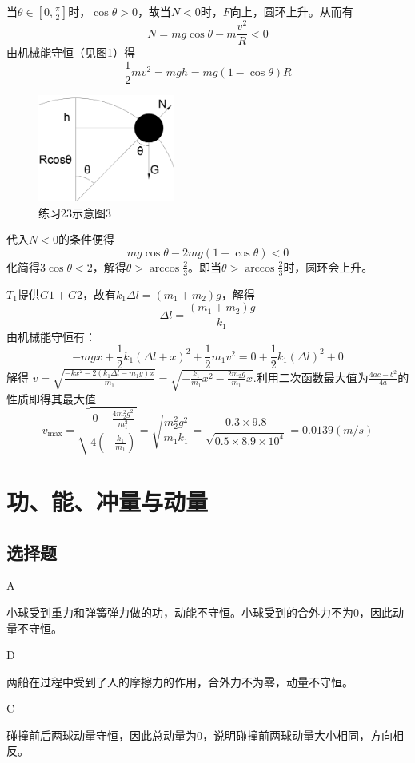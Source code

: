 \documentclass[b5paper,opensource,sourcefont,parskip]{qyxf-book}
\begin{document}
当$\theta\in[0,\frac{\pi}{2}]$时，$\cos\theta>0$，故当$N<0$时，$F$向上，圆环上升。从而有
\[N=mg\cos\theta-m\frac{v^2}{R}<0\]
由机械能守恒（见图\ref{fig:t23-3}）得
\[\frac{1}{2}mv^2=mgh=mg(1-\cos\theta)R\]

\begin{figure}[htbp]
	\centering
	\includegraphics[height=100pt]{Chp2_illus4.png}
	\caption{练习23示意图3}\label{fig:t23-3}
\end{figure}

代入$N<0$的条件便得
\[mg\cos\theta-2mg(1-\cos\theta)<0\]
化简得$3\cos\theta<2$，解得$\theta>\arccos\frac{2}{3}$。即当$\theta>\arccos\frac{2}{3}$时，圆环会上升。


\solve $T_1$提供$G1+G2$，故有$k_1\Delta l=(m_1+m_2)g$，解得
\[\Delta l=\frac{(m_1+m_2)g}{k_1}\]
由机械能守恒有：
\[-mgx+\frac{1}{2}k_1(\Delta l+x)^2+\frac{1}{2}m_1v^2=0+\frac{1}{2}k_1(\Delta l)^2+0\]
解得
$v=\sqrt{\frac{-kx^2-2(k_1\Delta l-m_1g)x}{m_1}}=\sqrt{-\frac{k_1}{m_1}x^2-\frac{2m_2g}{m_1}x}$.利用二次函数最大值为$\frac{4ac-b^2}{4a}$的性质即得其最大值
\[
v_{\text{max}}=\sqrt{\frac{0-\frac{4m_2^2g^2}{m_1^2}}{4\left(-\frac{k_1}{m_1}\right)}}=\sqrt{\frac{m_2^2g^2}{m_1k_1}}=\frac{0.3\times 9.8}{\sqrt{0.5\times 8.9\times 10^4}}=0.0139(m/s)
\]



\chapter{功、能、冲量与动量}
\section{选择题}

A

\solve 小球受到重力和弹簧弹力做的功，动能不守恒。小球受到的合外力不为0，因此动量不守恒。

D

\solve 两船在过程中受到了人的摩擦力的作用，合外力不为零，动量不守恒。

C

\solve 碰撞前后两球动量守恒，因此总动量为0，说明碰撞前两球动量大小相同，方向相反。
\end{document}
